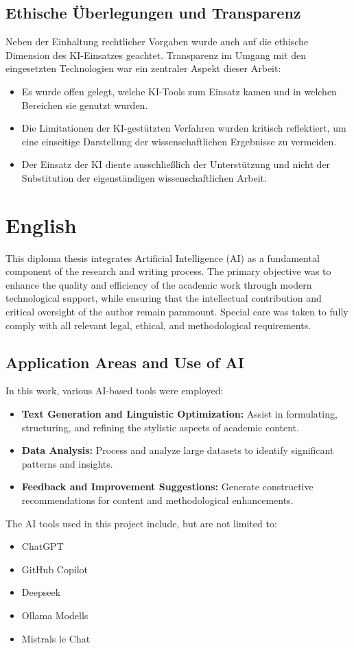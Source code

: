\subsection*{Ethische Überlegungen und Transparenz}
Neben der Einhaltung rechtlicher Vorgaben wurde auch auf die ethische Dimension des KI-Einsatzes geachtet. Transparenz im Umgang mit den eingesetzten Technologien war ein zentraler Aspekt dieser Arbeit:
\begin{itemize}
    \item Es wurde offen gelegt, welche KI-Tools zum Einsatz kamen und in welchen Bereichen sie genutzt wurden.
    \item Die Limitationen der KI-gestützten Verfahren wurden kritisch reflektiert, um eine einseitige Darstellung der wissenschaftlichen Ergebnisse zu vermeiden.
    \item Der Einsatz der KI diente ausschließlich der Unterstützung und nicht der Substitution der eigenständigen wissenschaftlichen Arbeit.
\end{itemize}

\section*{English}
This diploma thesis integrates Artificial Intelligence (AI) as a fundamental component of the research and writing process. The primary objective was to enhance the quality and efficiency of the academic work through modern technological support, while ensuring that the intellectual contribution and critical oversight of the author remain paramount. Special care was taken to fully comply with all relevant legal, ethical, and methodological requirements.

\subsection*{Application Areas and Use of AI}
In this work, various AI-based tools were employed:
\begin{itemize}
    \item \textbf{Text Generation and Linguistic Optimization:} Assist in formulating, structuring, and refining the stylistic aspects of academic content.
    \item \textbf{Data Analysis:} Process and analyze large datasets to identify significant patterns and insights.
    \item \textbf{Feedback and Improvement Suggestions:} Generate constructive recommendations for content and methodological enhancements.
\end{itemize}
The AI tools used in this project include, but are not limited to:
\begin{itemize}
    \item ChatGPT
    \item GitHub Copilot
    \item Deepseek
    \item Ollama Modells
    \item Mistrals le Chat
\end{itemize}

